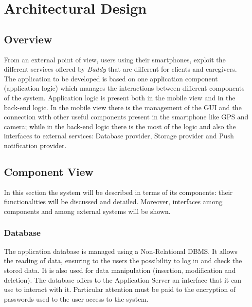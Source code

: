 \documentclass[../../dd.tex]{subfiles}
\begin{document}
\chapter{Architectural Design}
    \section{Overview}
    From an external point of view, users using their smartphones, exploit the different
    services offered by \textit{Baddy} that are different for clients and caregivers.
    The application to be developed is based on one application component (application logic) which manages the interactions
    between different components of the system.
    Application logic is present both in the mobile view and in the back-end logic.
    In the mobile view there is the management of the GUI and the connection with other useful components
    present in the smartphone like GPS and camera;
    while in the back-end logic there is the most of the logic and also the interfaces to external services:
    Database provider, Storage provider and Push notification provider.
    \section{Component View}
    In this section the system will be described in terms of its components: their
    functionalities will be discussed and detailed.
    Moreover, interfaces among components and among external systems will be shown.
    \subsection{Database}
    The application database is managed using a Non-Relational DBMS.
    It allows the reading of data, ensuring to the users the possibility to log in and check the stored data.
    It is also used for data manipulation (insertion, modification and deletion).
    The database offers to the Application Server an interface that it can use
    to interact with it.
    Particular attention must be paid to the encryption of passwords used to the user access to the system.
\end{document}
